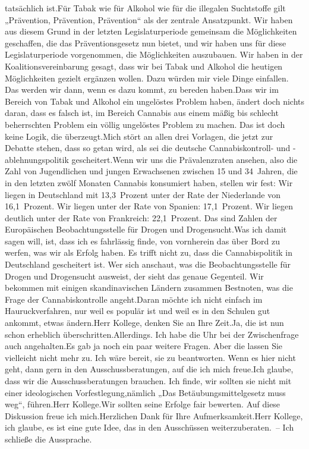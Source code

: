 \documentclass{article}
\begin{document}
tatsächlich ist.Für Tabak wie für Alkohol wie für die illegalen Suchtstoffe gilt „Prävention, Prävention, Prävention“ als der zentrale Ansatzpunkt. Wir haben aus diesem Grund in der letzten Legislaturperiode gemeinsam die Möglichkeiten geschaffen, die das Präventionsgesetz nun bietet, und wir haben uns für diese Legislaturperiode vorgenommen, die Möglichkeiten auszubauen. Wir haben in der Koalitionsvereinbarung gesagt, dass wir bei Tabak und Alkohol die heutigen Möglichkeiten gezielt ergänzen wollen. Dazu würden mir viele Dinge einfallen. Das werden wir dann, wenn es dazu kommt, zu bereden haben.Dass wir im Bereich von Tabak und Alkohol ein ungelöstes Problem haben, ändert doch nichts daran, dass es falsch ist, im Bereich Cannabis aus einem mäßig bis schlecht beherrschten Problem ein völlig ungelöstes Problem zu machen. Das ist doch keine Logik, die überzeugt.Mich stört an allen drei Vorlagen, die jetzt zur Debatte stehen, dass so getan wird, als sei die deutsche Cannabiskontroll- und -ablehnungspolitik gescheitert.Wenn wir uns die Prävalenzraten ansehen, also die Zahl von Jugendlichen und jungen Erwachsenen zwischen 15 und 34 Jahren, die in den letzten zwölf Monaten Cannabis konsumiert haben, stellen wir fest: Wir liegen in Deutschland mit 13,3 Prozent unter der Rate der Niederlande von 16,1 Prozent. Wir liegen unter der Rate von Spanien: 17,1 Prozent. Wir liegen deutlich unter der Rate von Frankreich: 22,1 Prozent. Das sind Zahlen der Europäischen Beobachtungsstelle für Drogen und Drogensucht.Was ich damit sagen will, ist, dass ich es fahrlässig finde, von vornherein das über Bord zu werfen, was wir als Erfolg haben. Es trifft nicht zu, dass die Cannabispolitik in Deutschland gescheitert ist. Wer sich anschaut, was die Beobachtungsstelle für Drogen und Drogensucht ausweist, der sieht das genaue Gegenteil. Wir bekommen mit einigen skandinavischen Ländern zusammen Bestnoten, was die Frage der Cannabiskontrolle angeht.Daran möchte ich nicht einfach im Hauruckverfahren, nur weil es populär ist und weil es in den Schulen gut ankommt, etwas ändern.Herr Kollege, denken Sie an Ihre Zeit.Ja, die ist nun schon erheblich überschritten.Allerdings. Ich habe die Uhr bei der Zwischenfrage auch angehalten.Es gab ja noch ein paar weitere Fragen. Aber die lassen Sie vielleicht nicht mehr zu. Ich wäre bereit, sie zu beantworten. Wenn es hier nicht geht, dann gern in den Ausschussberatungen, auf die ich mich freue.Ich glaube, dass wir die Ausschussberatungen brauchen. Ich finde, wir sollten sie nicht mit einer ideologischen Vorfestlegung,nämlich „Das Betäubungsmittelgesetz muss weg“, führen.Herr Kollege.Wir sollten seine Erfolge fair bewerten. Auf diese Diskussion freue ich mich.Herzlichen Dank für Ihre Aufmerksamkeit.Herr Kollege, ich glaube, es ist eine gute Idee, das in den Ausschüssen weiterzuberaten. – Ich schließe die Aussprache.
\end{document}
